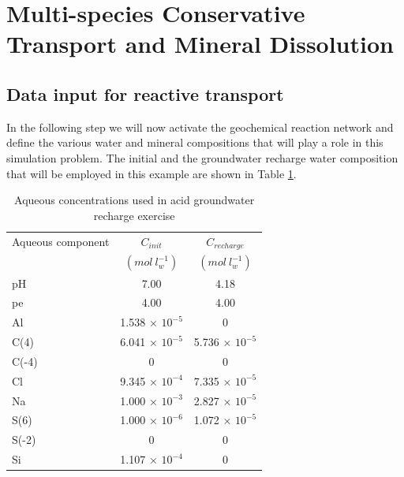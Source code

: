 \section[Multi-species Conservative Transport and Mineral Dissolution]{Multi-species Conservative Transport and Mineral Dissolution}

\subsection[Data input for reactive transport]{Data input for reactive transport}

In the following step we will now activate the geochemical reaction network and define the various water and mineral compositions that will play a role in this simulation problem. The initial and the groundwater recharge water composition that will be employed in this example are shown in Table \ref{franken_caqu}. 

\begin{table}
\caption{Aqueous concentrations used in acid groundwater recharge exercise}
\begin{center}
\begin{tabular}{l c c}
\hline
Aqueous  component        & $C_{init}$ & $C_{recharge}$      \\
                  & $(mol\ l^{-1}_w)$   & $(mol\ l^{-1}_w)$      \\ \hline
pH              &   7.00    &  4.18           \\
pe              &   4.00    &  4.00           \\
Al              &  1.538 $\times$ $10^{-5}$ & 0   \\
C(4)            &  6.041 $\times$ $10^{-5}$ & 5.736 $\times$ $10^{-5}$   \\
C(-4)           &  0                       &     0                     \\
Cl              &  9.345 $\times$ $10^{-4}$ & 7.335 $\times$ $10^{-5}$   \\
Na              &  1.000 $\times$ $10^{-3}$ & 2.827 $\times$ $10^{-5}$   \\
S(6)            &  1.000 $\times$ $10^{-6}$ & 1.072 $\times$ $10^{-5}$   \\
S(-2)           &     0             &     0               \\
Si              &  1.107 $\times$ $10^{-4}$ & 0  \\ \hline
\end{tabular}
\label{franken_caqu}
\end{center}
\end{table}


